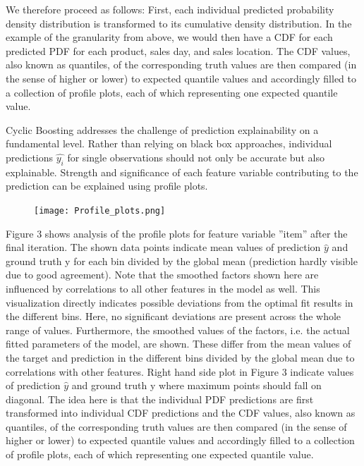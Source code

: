 \documentclass[BCOR=1mm, DIV=calc,10pt,
twoside=true,
twocolumn,
headings=normal]{scrartcl}
\begin{document}
We therefore proceed as follows: First, each individual predicted probability density distribution is transformed to its cumulative density distribution. In the example of the granularity from above, we would then have a CDF for each predicted PDF for each product, sales day, and sales location. The CDF values, also known as quantiles, of the corresponding truth values are then compared (in the sense of higher or lower) to expected quantile values and accordingly filled to a collection of profile plots, each of which representing one expected quantile value.

Cyclic Boosting addresses the challenge of prediction explainability on a fundamental level. Rather than relying on black box approaches, individual predictions $\hat{y_i}$ for single
observations should not only be accurate but also explainable. Strength and significance of
each feature variable contributing to the prediction can be explained using profile plots.

\begin{figure}[htp]
    \centering
    \texttt{[image: Profile\_plots.png]}
    \caption{}
     \label{fig:Profile Plots}
\end{figure}

Figure 3 shows analysis of the profile plots for feature variable ”item” after the
final iteration. The shown data points indicate mean values of prediction $\hat{y}$ and ground truth y for each bin divided by the global mean (prediction hardly visible due to good agreement). Note that the smoothed factors shown here are influenced by correlations to all other features in the model as well. This visualization directly
indicates possible deviations from the optimal fit results
in the different bins. Here, no significant deviations are
present across the whole range of values. Furthermore,
the smoothed values of the factors, i.e. the actual fitted
parameters of the model, are shown. These differ from the
mean values of the target and prediction in the different
bins divided by the global mean due to correlations with
other features. Right hand side plot in Figure 3 indicate values of prediction $\hat{y}$ and ground truth y where maximum points should fall on diagonal.
The idea here is that the individual PDF predictions are first transformed into individual
CDF predictions and the CDF values, also known as quantiles, of the corresponding truth
values are then compared (in the sense of higher or lower) to expected quantile values and
accordingly filled to a collection of profile plots, each of which representing one
expected quantile value.
\end{document}
